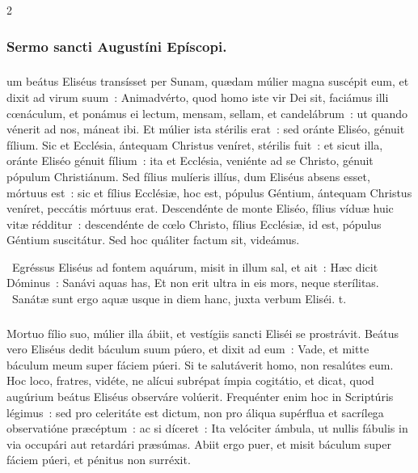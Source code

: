 \documentclass[9pt,twoside]{extarticle}
\begin{document}
\begin{multicols}{2}
\subsubsection*{\center Sermo sancti Augustíni Epíscopi.}
\subsubsection*{\center {}}
um beátus Eliséus transísset per Sunam, quædam múlier magna suscépit eum, et dixit ad virum suum~: Animadvérto, quod homo iste vir Dei sit, faciámus illi cœnáculum, et ponámus ei lectum, mensam, sellam, et candelábrum~: ut quando vénerit ad nos, máneat ibi. Et múlier ista stérilis erat~: sed oránte Eliséo, génuit fílium. Sic et Ecclésia, ántequam Christus veníret, stérilis fuit~: et sicut illa, oránte Eliséo génuit fílium~: ita et Ecclésia, veniénte ad se Christo, génuit pópulum Christiánum. Sed fílius mulíeris illíus, dum Eliséus absens esset, mórtuus est~: sic et fílius Ecclésiæ, hoc est, pópulus Géntium, ántequam Christus veníret, peccátis mórtuus erat. Descendénte de monte Eliséo, fílius víduæ huic vitæ rédditur~: descendénte de cœlo Christo, fílius Ecclésiæ, id est, pópulus Géntium suscitátur. Sed hoc quáliter factum sit, videámus.

\begin{tightlist}{}
\item {}~Egréssus Eliséus ad fontem aquárum, misit in illum sal, et ait~: Hæc dicit Dóminus~: Sanávi aquas has, \textred{*} Et non erit ultra in eis mors, neque sterílitas. ~Sanátæ sunt ergo aquæ usque in diem hanc, juxta verbum Eliséi. t.
\end{tightlist}

\subsubsection*{\center {}}
\lettrine{M}ortuo fílio suo, múlier illa ábiit, et vestígiis sancti Eliséi se prostrávit. Beátus vero Eliséus dedit báculum suum púero, et dixit ad eum~: Vade, et mitte báculum meum super fáciem púeri. Si te salutáverit homo, non resalútes eum. Hoc loco, fratres, vidéte, ne alícui subrépat ímpia cogitátio, et dicat, quod augúrium beátus Eliséus observáre volúerit. Frequénter enim hoc in Scriptúris légimus~: sed pro celeritáte est dictum, non pro áliqua supérflua et sacrílega observatióne præcéptum~: ac si díceret~: Ita velóciter ámbula, ut nullis fábulis in via occupári aut retardári præsúmas. Abiit ergo puer, et misit báculum super fáciem púeri, et pénitus non surréxit.


\end{multicols}
\end{document}
